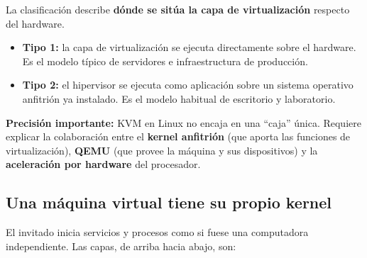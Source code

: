 \documentclass[11pt,a4paper]{article}
\begin{document}
La clasificación describe \textbf{dónde se sitúa la capa de virtualización} respecto del hardware.

\begin{center}
\end{center}

\begin{itemize}
  \item \textbf{Tipo 1:} la capa de virtualización se ejecuta directamente sobre el hardware.
        Es el modelo típico de servidores e infraestructura de producción.
  \item \textbf{Tipo 2:} el hipervisor se ejecuta como aplicación sobre un sistema operativo
        anfitrión ya instalado. Es el modelo habitual de escritorio y laboratorio.
\end{itemize}

\begin{aviso}
\textbf{Precisión importante:} KVM en Linux no encaja en una \textquotedblleft caja\textquotedblright{} única.
Requiere explicar la colaboración entre el \textbf{kernel anfitrión} (que aporta las funciones
de virtualización), \textbf{QEMU} (que provee la máquina y sus dispositivos) y la
\textbf{aceleración por hardware} del procesador.
\end{aviso}

\subsection{Una máquina virtual tiene su propio kernel}

El invitado inicia servicios y procesos como si fuese una computadora independiente.
Las capas, de arriba hacia abajo, son:
\end{document}
